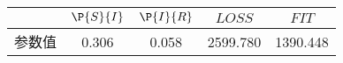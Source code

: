 \begin{tabular}{ccccc}
\hline
&$\P{S}{I}$&$\P{I}{R}$&$LOSS$&$FIT$\\
\hline
参数值&0.306&0.058&2599.780&1390.448\\
\hline
\end{tabular}